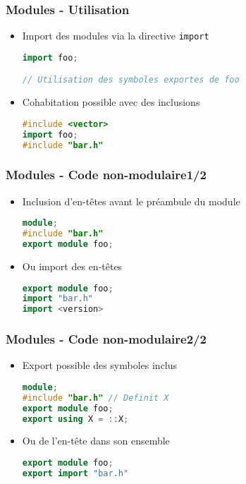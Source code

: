 \documentclass[C++.tex]{subfiles}
\begin{document}
\begin{frame}[fragile]
	\frametitle{Modules - Utilisation}
	\begin{itemize}
		\item Import des modules via la directive \lstinline|import|

		\begin{lstlisting}[language=C++]
import foo;

// Utilisation des symboles exportes de foo\end{lstlisting}

		\item Cohabitation possible avec des inclusions
		\begin{lstlisting}[language=C++]
#include <vector>
import foo;
#include "bar.h"\end{lstlisting}
	\end{itemize}
\end{frame}

\begin{frame}[fragile]
	\frametitle{Modules - Code non-modulaire\titlehfill{}1/2}
	\begin{itemize}
		\item Inclusion d'en-têtes avant le préambule du module


		\begin{lstlisting}[language=C++]
module;
#include "bar.h"
export module foo;\end{lstlisting}
	
		\item Ou import des en-têtes


		\begin{lstlisting}[language=C++]
export module foo;
import "bar.h"
import <version>\end{lstlisting}
	\end{itemize}
\end{frame}

\begin{frame}[fragile]
	\frametitle{Modules - Code non-modulaire\titlehfill{}2/2}
	\begin{itemize}
		\item Export possible des symboles inclus

		\begin{lstlisting}[language=C++]
module;
#include "bar.h" // Definit X
export module foo;
export using X = ::X;\end{lstlisting}

		\item Ou de l'en-tête dans son ensemble

		\begin{lstlisting}[language=C++]
export module foo;
export import "bar.h"\end{lstlisting}
	\end{itemize}
\end{frame}
\end{document}
